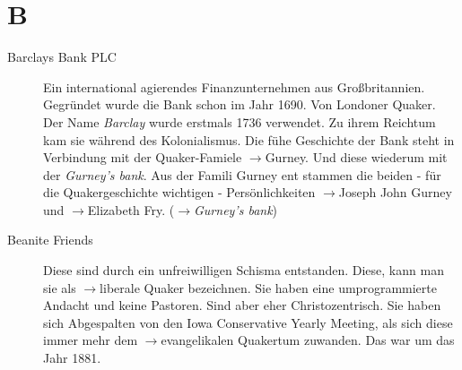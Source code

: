\section*{B}

\articlesize

\begin{description}


 \item[Barclays Bank PLC] Ein international agierendes Finanzunternehmen aus
Großbritannien. Gegründet wurde die Bank schon im Jahr 1690. Von Londoner
Quaker. Der Name \textit{Barclay} wurde erstmals 1736 verwendet. Zu ihrem
Reichtum kam sie während des Kolonialismus. Die fühe Geschichte der Bank steht
in Verbindung mit der Quaker-Famiele $\to$Gurney. Und diese wiederum mit der
\textit{Gurney's bank}. Aus der Famili  Gurney ent stammen die beiden - für die
Quakergeschichte wichtigen - Persönlichkeiten $\to$Joseph John Gurney und
$\to$Elizabeth Fry. ($\to$\textit{Gurney's bank})

 \item[Beanite Friends]
 Diese sind durch ein unfreiwilligen Schisma entstanden. Diese, kann man sie als
$\to$liberale Quaker bezeichnen. Sie haben eine umprogrammierte Andacht und
keine Pastoren. Sind aber eher Christozentrisch. Sie haben sich Abgespalten von
den Iowa Conservative Yearly Meeting, als sich diese immer mehr dem
$\to$evangelikalen Quakertum zuwanden. Das war um das Jahr 1881.
  



\end{description}
